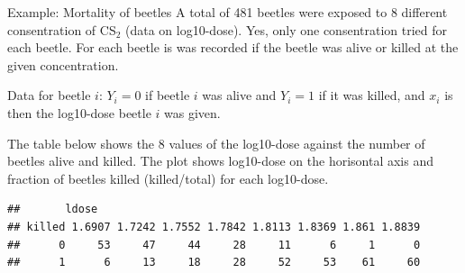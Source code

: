 \documentclass[
  ignorenonframetext,
]{beamer}
\newenvironment{Shaded}{\begin{snugshade}}{\end{snugshade}}
\newcommand{\CommentTok}[1]{\textcolor[rgb]{0.56,0.35,0.01}{\textit{#1}}}
\newcommand{\ConstantTok}[1]{\textcolor[rgb]{0.56,0.35,0.01}{#1}}
\newcommand{\ControlFlowTok}[1]{\textcolor[rgb]{0.13,0.29,0.53}{\textbf{#1}}}
\newcommand{\DecValTok}[1]{\textcolor[rgb]{0.00,0.00,0.81}{#1}}
\newcommand{\FunctionTok}[1]{\textcolor[rgb]{0.13,0.29,0.53}{\textbf{#1}}}
\newcommand{\NormalTok}[1]{#1}
\newcommand{\OtherTok}[1]{\textcolor[rgb]{0.56,0.35,0.01}{#1}}
\newcommand{\SpecialCharTok}[1]{\textcolor[rgb]{0.81,0.36,0.00}{\textbf{#1}}}
\newcommand{\StringTok}[1]{\textcolor[rgb]{0.31,0.60,0.02}{#1}}
\begin{document}
\begin{frame}[fragile]
\begin{block}{Example: Mortality of beetles}
\protect\hypertarget{example-mortality-of-beetles}{}
A total of 481 beetles were exposed to 8 different consentration of
CS\(_2\) (data on log10-dose). Yes, only one consentration tried for
each beetle. For each beetle is was recorded if the beetle was alive or
killed at the given concentration.

Data for beetle \(i\): \(Y_i=0\) if beetle \(i\) was alive and \(Y_i=1\)
if it was killed, and \(x_i\) is then the log10-dose beetle \(i\) was
given.

The table below shows the 8 values of the log10-dose against the number
of beetles alive and killed. The plot shows log10-dose on the horisontal
axis and fraction of beetles killed (killed/total) for each log10-dose.

\begin{Shaded}
\end{Shaded}

\begin{verbatim}
##       ldose
## killed 1.6907 1.7242 1.7552 1.7842 1.8113 1.8369 1.861 1.8839
##      0     53     47     44     28     11      6     1      0
##      1      6     13     18     28     52     53    61     60
\end{verbatim}
\end{block}
\end{frame}
\end{document}
